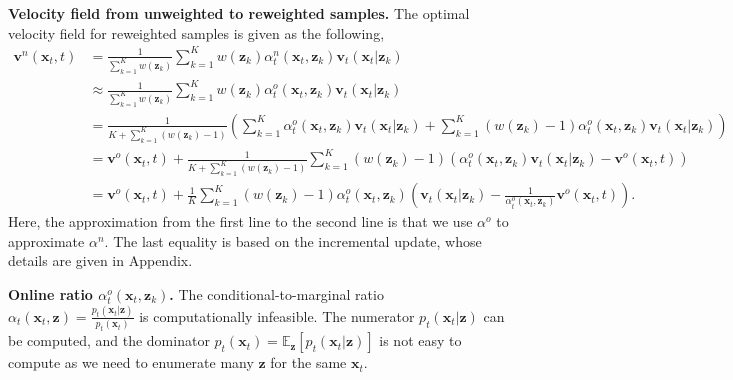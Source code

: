 \documentclass{article} %
\begin{document}
\noindent\textbf{Velocity field
from
unweighted to reweighted samples.} 
The optimal velocity field 
for reweighted samples
is given as the following,
\begin{align}
    \mathbf{v}^{n}(\mathbf{x}_t,t)
    &=  \frac{1}{\sum_{k=1}^Kw(\mathbf{z}_k)}
    \sum_{k=1}^K
    w(\mathbf{z}_k)
\alpha^n_t(\mathbf{x}_t,\mathbf{z}_k)
\mathbf{v}_t(\mathbf{x}_t|\mathbf{z}_k) \\
&\approx  \frac{1}{\sum_{k=1}^Kw(\mathbf{z}_k)}
\sum_{k=1}^K
    w(\mathbf{z}_k)
\alpha^o_t(\mathbf{x}_t,\mathbf{z}_k)
\mathbf{v}_t(\mathbf{x}_t|\mathbf{z}_k) \\
&=  \frac{1}{K + \sum_{k=1}^K(w(\mathbf{z}_k) - 1)}
(
\sum_{k=1}^K
\alpha^o_t(\mathbf{x}_t,\mathbf{z}_k)
\mathbf{v}_t(\mathbf{x}_t|\mathbf{z}_k) 
+ 
\sum_{k=1}^K
    ( w(\mathbf{z}_k) - 1)
\alpha^o_t(\mathbf{x}_t,\mathbf{z}_k)
\mathbf{v}_t(\mathbf{x}_t|\mathbf{z}_k)
)\\
&=  \mathbf{v}^o(\mathbf{x}_t,t)
+ \frac{1}{K + \sum_{k=1}^K
    ( w(\mathbf{z}_k) - 1)} 
\sum_{k=1}^K
    ( w(\mathbf{z}_k) - 1)
    (
\alpha^o_t(\mathbf{x}_t,\mathbf{z}_k)
\mathbf{v}_t(\mathbf{x}_t|\mathbf{z}_k)
- \mathbf{v}^o(\mathbf{x}_t,t)
)\\
&=  \mathbf{v}^o(\mathbf{x}_t,t)
+ \frac{1}{K} 
\sum_{k=1}^K
    ( w(\mathbf{z}_k) - 1)
\alpha^o_t(\mathbf{x}_t,\mathbf{z}_k)
(
\mathbf{v}_t(\mathbf{x}_t|\mathbf{z}_k)
- \frac{1}{\alpha^o_t(\mathbf{x}_t,\mathbf{z}_k)}\mathbf{v}^o(\mathbf{x}_t,t)
)
.
\end{align}
Here,
the approximation
from the first line to the second line
is that 
we use $\alpha^o$
to approximate $\alpha^n$.
The last equality
is based on the incremental update,
whose details are given in 
Appendix.

\noindent\textbf{Online ratio $\alpha^o_t(\mathbf{x}_t,\mathbf{z}_k)$.}
The conditional-to-marginal ratio
$\alpha_t(\mathbf{x}_t,\mathbf{z})
=
\frac{
p_t(\mathbf{x}_t|\mathbf{z})
}
{
p_t(\mathbf{x}_t)
}$ 
is computationally infeasible.
The numerator 
$p_t(\mathbf{x}_t|\mathbf{z})$
can be computed,
and the dominator
$
p_t(\mathbf{x}_t)
= \mathbb{E}_{\mathbf{z}} [p_t(\mathbf{x}_t|\mathbf{z})]
$
is not easy to compute
{as we need to enumerate
many $\mathbf{z}$
for the same $\mathbf{x}_t$}.
\end{document}

